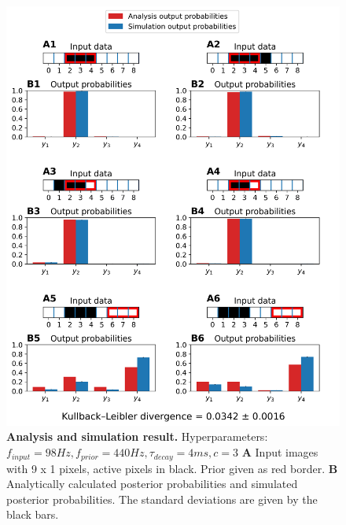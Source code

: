 \begin{figure}
  \includegraphics[width=\linewidth]{figures/1D/training/trainingEvaluation_98_440_4_c3.png}
      \caption{\textbf{Analysis and simulation result. } Hyperparameters: $f_{input} = 98 Hz, f_{prior} = 440 Hz, \tau_{decay} = 4 ms, c = 3$ \textbf{A} Input images with 9 x 1 pixels, active pixels in black. Prior given as red border. \textbf{B} Analytically calculated posterior probabilities and simulated posterior probabilities. The standard deviations are given by the black bars.}  
  \label{fig:1DTrainingEvaluationC3}
\end{figure}

